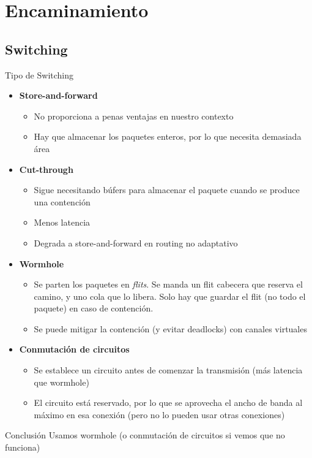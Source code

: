 \section{Encaminamiento}

\subsection{Switching}
\begin{frame}[allowframebreaks]{Tipo de Switching}
    \begin{itemize}
        \item \textbf{Store-and-forward}
        \begin{itemize}
            \item No proporciona a penas ventajas en nuestro contexto
            \item Hay que almacenar los paquetes enteros, por lo que necesita demasiada área
        \end{itemize}
        \item \textbf{Cut-through}
        \begin{itemize}
            \item Sigue necesitando búfers para almacenar el paquete cuando se produce una contención
            \item Menos latencia
            \item Degrada a store-and-forward en routing no adaptativo
        \end{itemize}
        \item \textbf{Wormhole}
        \begin{itemize}
            \item Se parten los paquetes en \textit{flits}. Se manda un flit cabecera que reserva el camino, y uno cola que lo libera. Solo hay que guardar el flit (no todo el paquete) en caso de contención.
            \item Se puede mitigar la contención (y evitar deadlocks) con canales virtuales
        \end{itemize}
        \item \textbf{Conmutación de circuitos}
        \begin{itemize}
            \item Se establece un circuito antes de comenzar la transmisión (más latencia que wormhole)
            \item El circuito está reservado, por lo que se aprovecha el ancho de banda al máximo en esa conexión (pero no lo pueden usar otras conexiones)
        \end{itemize}
    \end{itemize}
    \begin{exampleblock}{Conclusión}
        Usamos wormhole (o conmutación de circuitos si vemos que no funciona)
    \end{exampleblock}
\end{frame}

